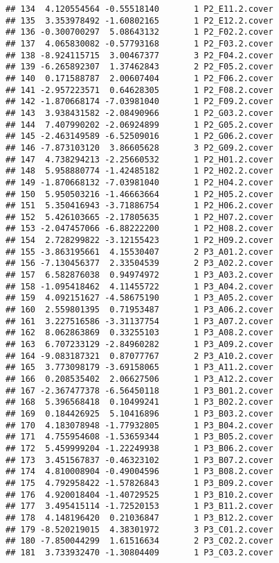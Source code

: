 \documentclass[]{article}
\begin{document}
\begin{verbatim}
## 134  4.120554564 -0.55518140       1 P2_E11.2.cover
## 135  3.353978492 -1.60802165       1 P2_E12.2.cover
## 136 -0.300700297  5.08643132       1 P2_F02.2.cover
## 137  4.065830082 -0.57793168       1 P2_F03.2.cover
## 138 -8.924115715  3.00467377       3 P2_F04.2.cover
## 139 -6.265892307  1.37462843       2 P2_F05.2.cover
## 140  0.171588787  2.00607404       1 P2_F06.2.cover
## 141 -2.957223571  0.64628305       1 P2_F08.2.cover
## 142 -1.870668174 -7.03981040       1 P2_F09.2.cover
## 143  3.938431582 -2.08490966       1 P2_G03.2.cover
## 144  7.407990202 -2.06924899       1 P2_G05.2.cover
## 145 -2.463149589 -6.52509016       1 P2_G06.2.cover
## 146 -7.873103120  3.86605628       3 P2_G09.2.cover
## 147  4.738294213 -2.25660532       1 P2_H01.2.cover
## 148  5.958880774 -1.42485182       1 P2_H02.2.cover
## 149 -1.870668132 -7.03981040       1 P2_H04.2.cover
## 150  5.950503216 -1.46663664       1 P2_H05.2.cover
## 151  5.350416943 -3.71886754       1 P2_H06.2.cover
## 152  5.426103665 -2.17805635       1 P2_H07.2.cover
## 153 -2.047457066 -6.88222200       1 P2_H08.2.cover
## 154  2.728299822 -3.12155423       1 P2_H09.2.cover
## 155 -3.863195661  4.15530407       2 P3_A01.2.cover
## 156 -7.130456377  2.33504539       2 P3_A02.2.cover
## 157  6.582876038  0.94974972       1 P3_A03.2.cover
## 158 -1.095418462  4.11455722       1 P3_A04.2.cover
## 159  4.092151627 -4.58675190       1 P3_A05.2.cover
## 160  2.559801395  0.71953487       1 P3_A06.2.cover
## 161  3.227516586 -3.31137754       1 P3_A07.2.cover
## 162  8.062863869  0.33255103       1 P3_A08.2.cover
## 163  6.707233129 -2.84960282       1 P3_A09.2.cover
## 164 -9.083187321  0.87077767       2 P3_A10.2.cover
## 165  3.773098179 -3.69158065       1 P3_A11.2.cover
## 166  0.208535402  2.06627506       1 P3_A12.2.cover
## 167 -2.367477378 -6.56450118       1 P3_B01.2.cover
## 168  5.396568418  0.10499241       1 P3_B02.2.cover
## 169  0.184426925  5.10416896       1 P3_B03.2.cover
## 170  4.183078948 -1.77932805       1 P3_B04.2.cover
## 171  4.755954608 -1.53659344       1 P3_B05.2.cover
## 172  5.459999204 -1.22249938       1 P3_B06.2.cover
## 173  3.451567837 -0.46323102       1 P3_B07.2.cover
## 174  4.810008904 -0.49004596       1 P3_B08.2.cover
## 175  4.792958422 -1.57826843       1 P3_B09.2.cover
## 176  4.920018404 -1.40729525       1 P3_B10.2.cover
## 177  3.495415114 -1.72520153       1 P3_B11.2.cover
## 178  4.148196420  0.21036847       1 P3_B12.2.cover
## 179 -8.520219015  4.38301972       3 P3_C01.2.cover
## 180 -7.850044299  1.61516634       2 P3_C02.2.cover
## 181  3.733932470 -1.30804409       1 P3_C03.2.cover

\end{verbatim}
\end{document}
